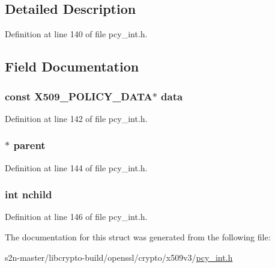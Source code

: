 \subsection{Detailed Description}


Definition at line 140 of file pcy\+\_\+int.\+h.



\subsection{Field Documentation}
\subsubsection[{\texorpdfstring{data}{data}}]{\setlength{\rightskip}{0pt plus 5cm}const {\bf X509\+\_\+\+P\+O\+L\+I\+C\+Y\+\_\+\+D\+A\+TA}$\ast$ data}\hypertarget{struct_x509___p_o_l_i_c_y___n_o_d_e__st_acc47c86faba298383084674e1f66ba39}{}\label{struct_x509___p_o_l_i_c_y___n_o_d_e__st_acc47c86faba298383084674e1f66ba39}


Definition at line 142 of file pcy\+\_\+int.\+h.

\subsubsection[{\texorpdfstring{parent}{parent}}]{$\ast$ parent}\hypertarget{struct_x509___p_o_l_i_c_y___n_o_d_e__st_acda0d8f1ad806d9e34318924fb335699}{}\label{struct_x509___p_o_l_i_c_y___n_o_d_e__st_acda0d8f1ad806d9e34318924fb335699}


Definition at line 144 of file pcy\+\_\+int.\+h.

\subsubsection[{\texorpdfstring{nchild}{nchild}}]{\setlength{\rightskip}{0pt plus 5cm}int nchild}\hypertarget{struct_x509___p_o_l_i_c_y___n_o_d_e__st_ae005f9369d7412d4c3e8383844560a05}{}\label{struct_x509___p_o_l_i_c_y___n_o_d_e__st_ae005f9369d7412d4c3e8383844560a05}


Definition at line 146 of file pcy\+\_\+int.\+h.



The documentation for this struct was generated from the following file\+:\begin{DoxyCompactItemize}
\item 
s2n-\/master/libcrypto-\/build/openssl/crypto/x509v3/\hyperlink{pcy__int_8h}{pcy\+\_\+int.\+h}\end{DoxyCompactItemize}
